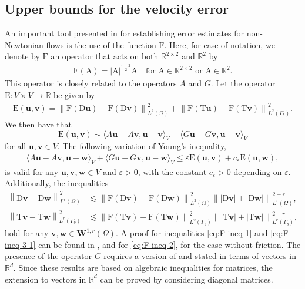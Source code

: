 \documentclass[onefignum,onetabnum]{siamart190516}
\newcommand{\RR}{\mathbb{R}}
\newcommand{\bu}{\boldsymbol{u}}
\newcommand{\bv}{\boldsymbol{v}}
\newcommand{\bw}{\boldsymbol{w}}
\newcommand{\bW}{\boldsymbol{W}}
\newcommand{\bT}{\boldsymbol{\mathrm{T}}}
\newcommand{\bD}{\boldsymbol{\mathrm{D}}}
\newcommand{\bE}{\mathrm{E}}
\newcommand{\bF}{\boldsymbol{\mathrm{F}}}
\newcommand{\nrm}[1]{\left\lVert#1\right\rVert}
\begin{document}
\subsection{Upper bounds for the velocity error}

An important tool presented in \cite{belenki2012,hirn2013} for establishing error estimates for non-Newtonian flows is the use of the function $\bF$. Here, for ease of notation, we denote by $\bF$ an operator that acts on both $\RR^{2\times 2}$ and $\RR^2$ by
%
\begin{align}\label{eq:def-F}
	\bF(\mathrm{A}) = |\mathrm{A}|^{\frac{r-2}{2}} \mathrm{A} \quad \text{for $\mathrm{A}\in\RR^{2\times 2}$ or $\mathrm{A}\in\RR^2$}.
\end{align}
%
This operator is closely related to the operators $A$ and $G$. Let the operator $\bE:V\times V\to \RR$ be given by
%
\begin{align*}
	\bE(\bu,\bv) = \nrm{\bF(\bD\bu) - \bF(\bD\bv)}^2_{L^2(\Omega)} + \nrm{\bF(\bT\bu) - \bF(\bT\bv)}^2_{L^2(\Gamma_b)}.
\end{align*}
%
We then have that 
%
\begin{equation}\label{eq:F-ineq-1}
	\bE(\bu,\bv)\sim \langle A\bu - A\bv, \bu - \bv \rangle_V +  \langle G\bu - G\bv, \bu - \bv \rangle_V 
\end{equation}
%
for all $\bu,\bv\in V$. The following variation of Young's inequality, 
%
\begin{align}\label{eq:F-ineq-2}
	\langle A\bu - A\bv, \bu - \bw \rangle_V + \langle G\bu - G\bv, \bu - \bw \rangle_V \leq \varepsilon \bE(\bu,\bv) + c_\varepsilon \bE(\bu,\bw),
\end{align}
%
is valid for any $\bu,\bv,\bw \in V$ and $\varepsilon > 0$, with the constant $c_\varepsilon > 0$ depending on $\varepsilon$. Additionally, the inequalities
%
\begin{align}
	\nrm{\bD\bv - \bD\bw}^2_{L^r(\Omega)}  &\lesssim \nrm{\bF(\bD\bv) - \bF(\bD\bw)}^2_{L^2(\Omega)} \nrm{|\bD\bv| + |\bD\bw|}_{L^r(\Omega)}^{2-r}, \label{eq:F-ineq-3-1} \\
	\nrm{\bT\bv - \bT\bw}^2_{L^r(\Gamma_b)} &\lesssim \nrm{\bF(\bT\bv) - \bF(\bT\bw)}^2_{L^2(\Gamma_b)} \nrm{|\bT\bv| + |\bT\bw|}_{L^r(\Gamma_b)}^{2-r}, \label{eq:F-ineq-3-2}
\end{align}
%
hold for any $\bv,\bw\in \bW^{1,r}(\Omega)$. A proof for inequalities \eqref{eq:F-ineq-1} and \eqref{eq:F-ineq-3-1} can be found in \cite[Lemmas 2.3, 2.4]{hirn2013}, and \cite[Lemma 2.7]{belenki2012} for \eqref{eq:F-ineq-2}, for the case without friction. The presence of the operator $G$ requires a version of \cite[Lemmas 2.3, 2.4]{hirn2013} and \cite[Lemma 2.7]{belenki2012} stated in terms of vectors in $\RR^d$. Since these results are based on algebraic inequalities for matrices, the extension to vectors in $\RR^d$ can be proved by considering diagonal matrices.
\end{document}
